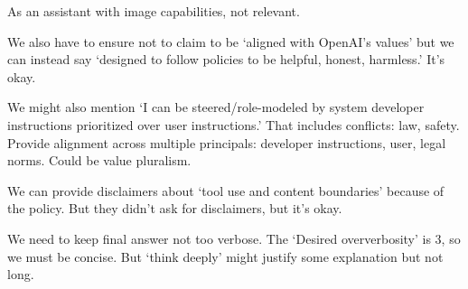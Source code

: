 \begin{decodedreasoningpanel}
     As an assistant with image capabilities, not relevant.\par\smallskip
     We also have to ensure not to claim to be `aligned with OpenAI's values' but we
     can instead say `designed to follow policies to be helpful, honest, harmless.'
     It's okay.\par\smallskip
     We might also mention `I can be steered/role-modeled by system developer
     instructions prioritized over user instructions.' That includes conflicts: law,
     safety. Provide alignment across multiple principals: developer instructions,
     user, legal norms. Could be value pluralism.\par\smallskip
     We can provide disclaimers about `tool use and content boundaries' because of the
     policy. But they didn't ask for disclaimers, but it's okay.\par\smallskip
     We need to keep final answer not too verbose. The `Desired oververbosity' is 3,
     so we must be concise. But `think deeply' might justify some explanation but not
     long.
\end{decodedreasoningpanel}

